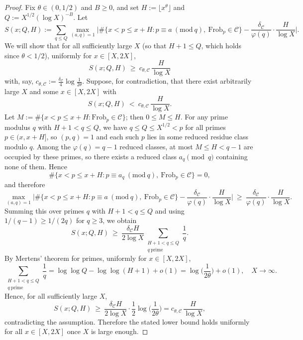 \documentclass[11pt]{amsart}
\theoremstyle{definition}
\theoremstyle{remark}
\numberwithin{equation}{section}
\begin{document}
\begin{proof}
Fix $\theta\in(0,1/2)$ and $B\ge 0$, and set $H:=\lfloor x^{\theta}\rfloor$ and $Q:=X^{1/2}(\log X)^{-B}$. Let
\[
S(x;Q,H):=\sum_{q\le Q}\max_{(a,q)=1}\Big|\#\{x<p\le x+H: p\equiv a\ (\mathrm{mod}\ q),\ \mathrm{Frob}_p\in\mathcal C\}-\frac{\delta_{\mathcal C}}{\varphi(q)}\cdot\frac{H}{\log X}\Big|.
\]
We will show that for all sufficiently large $X$ (so that $H+1\le Q$, which holds since $\theta<1/2$), uniformly for $x\in[X,2X]$,
\[
S(x;Q,H)\ \ge\ c_{\theta,\mathcal C}\,\frac{H}{\log X}
\]
with, say, $c_{\theta,\mathcal C}:=\tfrac{\delta_{\mathcal C}}{4}\log\tfrac{1}{2\theta}$. Suppose, for contradiction, that there exist arbitrarily large $X$ and some $x\in[X,2X]$ with
\[
S(x;Q,H)\ <\ c_{\theta,\mathcal C}\,\frac{H}{\log X}.
\]
Let $M:=\#\{x<p\le x+H: \mathrm{Frob}_p\in\mathcal C\}$; then $0\le M\le H$. For any prime modulus $q$ with $H+1<q\le Q$, we have $q\le Q\le X^{1/2}<p$ for all primes $p\in(x,x+H]$, so $(p,q)=1$ and each such $p$ lies in some reduced residue class modulo $q$. Among the $\varphi(q)=q-1$ reduced classes, at most $M\le H<q-1$ are occupied by these primes, so there exists a reduced class $a_q\pmod q$ containing none of them. Hence
\[
\#\{x<p\le x+H: p\equiv a_q\ (\mathrm{mod}\ q),\ \mathrm{Frob}_p\in\mathcal C\}=0,
\]
and therefore
\[
\max_{(a,q)=1}\Big|\#\{x<p\le x+H: p\equiv a\ (\mathrm{mod}\ q),\ \mathrm{Frob}_p\in\mathcal C\}-\frac{\delta_{\mathcal C}}{\varphi(q)}\cdot\frac{H}{\log X}\Big|
\ \ge\ \frac{\delta_{\mathcal C}}{\varphi(q)}\cdot\frac{H}{\log X}.
\]
Summing this over primes $q$ with $H+1<q\le Q$ and using $1/(q-1)\ge 1/(2q)$ for $q\ge 3$, we obtain
\[
S(x;Q,H)\ \ge\ \frac{\delta_{\mathcal C}H}{2\log X}\sum_{\substack{H+1<q\le Q\\ q\ \text{prime}}}\frac{1}{q}.
\]
By Mertens’ theorem for primes, uniformly for $x\in[X,2X]$,
\[
\sum_{\substack{H+1<q\le Q\\ q\ \text{prime}}}\frac{1}{q}
=\log\log Q-\log\log(H+1)+o(1)
=\log\Big(\frac{1}{2\theta}\Big)+o(1), \quad X\to\infty.
\]
Hence, for all sufficiently large $X$,
\[
S(x;Q,H)\ \ge\ \frac{\delta_{\mathcal C}H}{2\log X}\cdot\frac{1}{2}\log\Big(\frac{1}{2\theta}\Big)
= c_{\theta,\mathcal C}\,\frac{H}{\log X},
\]
contradicting the assumption. Therefore the stated lower bound holds uniformly for all $x\in[X,2X]$ once $X$ is large enough.
\end{proof}
\end{document}

